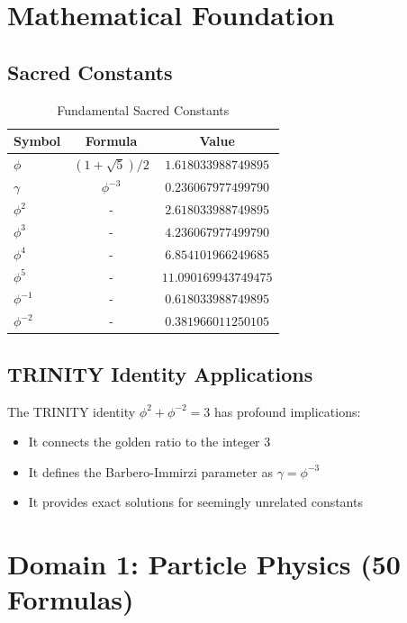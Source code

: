 \documentclass[12pt,a4paper]{article}
\begin{document}
\section{Mathematical Foundation}

\subsection{Sacred Constants}

\begin{table}[h]
\centering
\caption{Fundamental Sacred Constants}
\begin{tabular}{lcc}
\toprule
\textbf{Symbol} & \textbf{Formula} & \textbf{Value} \\
\midrule
$\phi$ & $(1+\sqrt{5})/2$ & $1.618033988749895$ \\
$\gamma$ & $\phi^{-3}$ & $0.236067977499790$ \\
$\phi^2$ & - & $2.618033988749895$ \\
$\phi^3$ & - & $4.236067977499790$ \\
$\phi^4$ & - & $6.854101966249685$ \\
$\phi^5$ & - & $11.090169943749475$ \\
$\phi^{-1}$ & - & $0.618033988749895$ \\
$\phi^{-2}$ & - & $0.381966011250105$ \\
\bottomrule
\end{tabular}
\end{table}

\subsection{TRINITY Identity Applications}

The TRINITY identity $\phi^2 + \phi^{-2} = 3$ has profound implications:
\begin{itemize}
    \item It connects the golden ratio to the integer 3
    \item It defines the Barbero-Immirzi parameter as $\gamma = \phi^{-3}$
    \item It provides exact solutions for seemingly unrelated constants
\end{itemize}

\section{Domain 1: Particle Physics (50 Formulas)}
\end{document}
